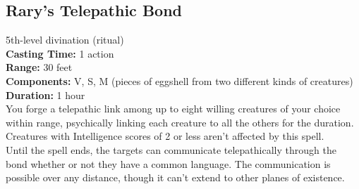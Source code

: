 \documentclass[11pt, A4paper, english]{article}
\begin{document}
		\subsection{Rary's Telepathic Bond}
5th-level divination (ritual) \\
\textbf{Casting Time:} 1 action \\
\textbf{Range:} 30 feet \\
\textbf{Components:} V, S, M (pieces of eggshell from two different kinds of creatures) \\
\textbf{Duration:} 1 hour \\
You forge a telepathic link among up to eight willing creatures of your choice within range, psychically linking each creature to all the others for the duration. Creatures with Intelligence scores of 2 or less aren't affected by this spell. \\
Until the spell ends, the targets can communicate telepathically through the bond whether or not they have a common language. The communication is possible over any distance, though it can’t extend to other planes of existence.
\end{document}
